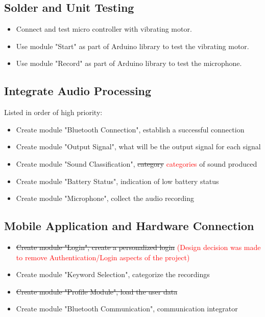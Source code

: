 \documentclass[12pt, titlepage]{article}
\begin{document}
\subsection{Solder and Unit Testing}
\begin{itemize}
\item Connect and test micro controller with vibrating motor.
\item Use module "Start" as part of Arduino library to test the vibrating motor.
\item Use module "Record" as part of Arduino library to test the microphone.
\end{itemize}



\subsection{Integrate Audio Processing}

Listed in order of high priority:
\begin{itemize}
\item Create module "Bluetooth Connection", establish a successful connection
\item Create module "Output Signal", what will be the output signal for each signal
\item Create module "Sound Classification", \sout{category} \textcolor{red}{categories} of sound produced
\item Create module "Battery Status", indication of low battery status
\item Create module "Microphone", collect the audio recording
\end{itemize}

\subsection{Mobile Application and Hardware Connection}

\begin{itemize}
\item \sout{Create module "Login", create a personalized login} \textcolor{red}{(Design decision was made to remove Authentication/Login aspects of the project)}
\item Create module "Keyword Selection", categorize the recordings
\item \sout{Create module "Profile Module", load the user data}
\item Create module "Bluetooth Communication", communication integrator
\end{itemize}
\end{document}
